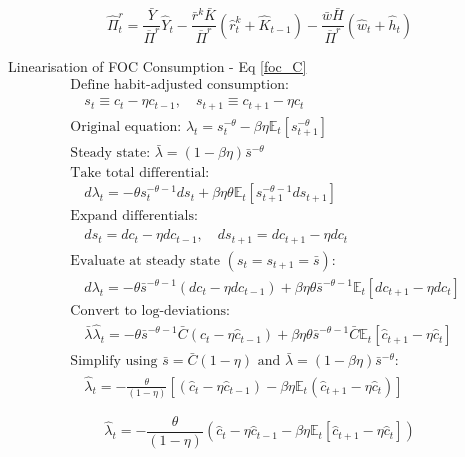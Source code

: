 \documentclass[11pt,preprint]{elsarticle}
\numberwithin{equation}{section}
\numberwithin{figure}{section}
\numberwithin{table}{section}
\begin{document}
\begin{equation}\label{intermediate_firm_profit_real_linearised_app}
\boxed{\widehat{\Pi}^r_t = \frac{\bar{Y}}{\overline{\Pi}^r}\hat{Y}_t - \frac{\bar{r}^k\bar{K}}{\overline{\Pi}^r}(\hat{r}^k_t + \hat{K}_{t-1}) - \frac{\bar{w}\bar{H}}{\overline{\Pi}^r}(\hat{w}_t + \hat{h}_t)}
\end{equation}

Linearisation of FOC Consumption - Eq \ref{foc_C} \begin{align*}
& \text{Define habit-adjusted consumption:} \\
& \quad s_t \equiv c_t - \eta c_{t-1}, \quad s_{t+1} \equiv c_{t+1} - \eta c_t \\[6pt]
& \text{Original equation: } \lambda_t = s_t^{-\theta} - \beta\eta \mathbb{E}_t [s_{t+1}^{-\theta}] \\[6pt]
& \text{Steady state: } \bar{\lambda} = (1 - \beta\eta)\bar{s}^{-\theta} \\[6pt]
& \text{Take total differential:} \\
& \quad d\lambda_t = -\theta s_t^{-\theta-1} ds_t + \beta\eta \theta \mathbb{E}_t [s_{t+1}^{-\theta-1} ds_{t+1}] \\[6pt]
& \text{Expand differentials:} \\
& \quad ds_t = dc_t - \eta dc_{t-1}, \quad ds_{t+1} = dc_{t+1} - \eta dc_t \\[6pt]
& \text{Evaluate at steady state } (s_t = s_{t+1} = \bar{s}): \\
& \quad d\lambda_t = -\theta \bar{s}^{-\theta-1} (dc_t - \eta dc_{t-1}) + \beta\eta \theta \bar{s}^{-\theta-1} \mathbb{E}_t [dc_{t+1} - \eta dc_t] \\[6pt]
& \text{Convert to log-deviations:} \\
& \quad \bar{\lambda}\hat{\lambda}_t = -\theta \bar{s}^{-\theta-1} \bar{C} (\hat{c}_t - \eta \hat{c}_{t-1}) + \beta\eta \theta \bar{s}^{-\theta-1} \bar{C} \mathbb{E}_t [\hat{c}_{t+1} - \eta \hat{c}_t] \\[6pt]
& \text{Simplify using } \bar{s} = \bar{C}(1-\eta) \text{ and } \bar{\lambda} = (1-\beta\eta)\bar{s}^{-\theta}: \\
& \quad \hat{\lambda}_t = -\frac{\theta}{(1-\eta)} \left[ (\hat{c}_t - \eta \hat{c}_{t-1}) - \beta\eta \mathbb{E}_t (\hat{c}_{t+1} - \eta \hat{c}_t) \right]
\end{align*}

\begin{equation}\label{foc_C_linearised_app}
\boxed{\hat{\lambda}_t = -\frac{\theta}{(1-\eta)} \left( \hat{c}_t - \eta \hat{c}_{t-1} - \beta\eta \mathbb{E}_t \left[\hat{c}_{t+1} - \eta \hat{c}_t\right] \right)}
\end{equation}
\end{document}
